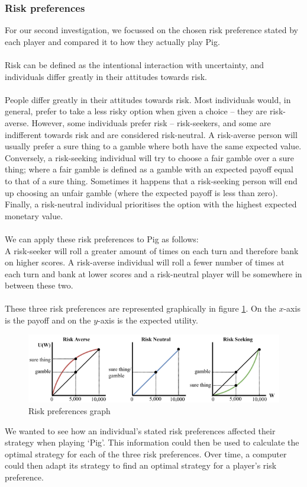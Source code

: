 \documentclass[a4paper,titlepage]{article}
\begin{document}
\subsubsection{Risk preferences}
For our second investigation, we focussed on the chosen risk preference stated by each player and compared it to how they actually play Pig.
\\
\\
Risk can be defined as the intentional interaction with uncertainty, and individuals differ greatly in their attitudes towards risk.\cite{what_is_risk_2017}
\\
\\
People differ greatly in their attitudes towards risk. Most individuals would, in general, prefer to take a less risky option when given a choice – they are risk-averse. However, some individuals prefer risk – risk-seekers, and some are indifferent towards risk and are considered risk-neutral. A risk-averse person will usually prefer a sure thing to a gamble where both have the same expected value. Conversely, a risk-seeking individual will try to choose a fair gamble over a sure thing; where a fair gamble is defined as a gamble with an expected payoff equal to that of a sure thing. Sometimes it happens that a risk-seeking person will end up choosing an unfair gamble (where the expected payoff is less than zero). Finally, a risk-neutral individual prioritises the option with the highest expected monetary value.
\\
\\
We can apply these risk preferences to Pig as follows:\\A risk-seeker will roll a greater amount of times on each turn and therefore bank on higher scores. A risk-averse individual will roll a fewer number of times at each turn and bank at lower scores and a risk-neutral player will be somewhere in between these two.
\\
\\
These three risk preferences are represented graphically in figure \ref{figure4}. On the $x$-axis is the payoff and on the $y$-axis is the expected utility.
\begin{figure}
\includegraphics[width=\textwidth]{lottery-a-5}
\caption{Risk preferences graph\label{figure4}}
\end{figure}
We wanted to see how an individual’s stated risk preferences affected their strategy when playing ‘Pig’. This information could then be used to calculate the optimal strategy for each of the three risk preferences. Over time, a computer could then adapt its strategy to find an optimal strategy for a player’s risk preference.
\end{document}
